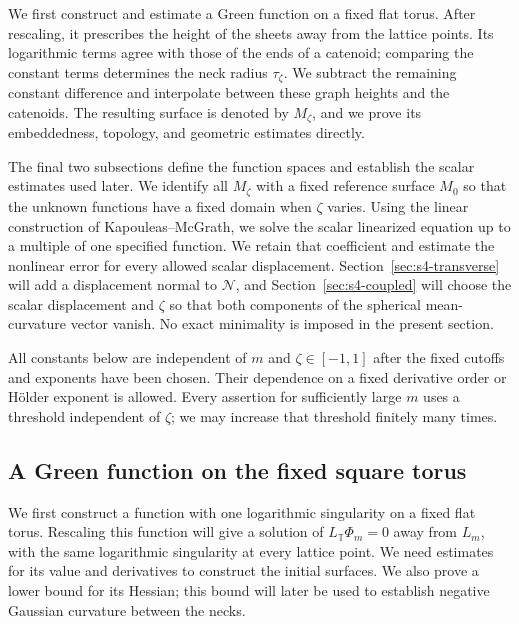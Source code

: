 \documentclass[a4paper,11pt,oneside,reqno]{amsart}
\numberwithin{equation}{section}
\theoremstyle{definition}
\begin{document}
We first construct and estimate a Green function on a fixed
flat torus. After rescaling, it prescribes the height of the
sheets away from the lattice points. Its logarithmic terms
agree with those of the ends of a catenoid; comparing the
constant terms determines the neck radius $\tau_\zeta$.
We subtract the remaining constant difference and interpolate
between these graph heights and the catenoids. The resulting
surface is denoted by $M_\zeta$, and we prove its embeddedness,
topology, and geometric estimates directly.

The final two subsections define the function spaces and
establish the scalar estimates used later. We identify all
$M_\zeta$ with a fixed reference surface $M_0$ so that the
unknown functions have a fixed domain when $\zeta$ varies.
Using the linear construction of Kapouleas--McGrath, we solve
the scalar linearized equation up to a multiple of one
specified function. We retain that coefficient and estimate
the nonlinear error for every allowed scalar displacement.
Section~\ref{sec:s4-transverse} will add a displacement
normal to $\mathcal N$, and Section~\ref{sec:s4-coupled}
will choose the scalar displacement and $\zeta$ so that
both components of the spherical mean-curvature vector vanish.
No exact minimality is imposed in the present section.

All constants below are independent of $m$ and
$\zeta\in[-1,1]$ after the fixed cutoffs and exponents have
been chosen. Their dependence on a fixed derivative order
or H\"older exponent is allowed. Every assertion for
sufficiently large $m$ uses a threshold independent of
$\zeta$; we may increase that threshold finitely many times.

\subsection{A Green function on the fixed square torus}

We first construct a function with one logarithmic singularity
on a fixed flat torus. Rescaling this function will give a
solution of $L_{\mathbb T}\Phi_m=0$ away from $L_m$, with the
same logarithmic singularity at every lattice point. We need
estimates for its value and derivatives to construct the
initial surfaces. We also prove a lower bound for its Hessian;
this bound will later be used to establish negative Gaussian
curvature between the necks.
\end{document}
